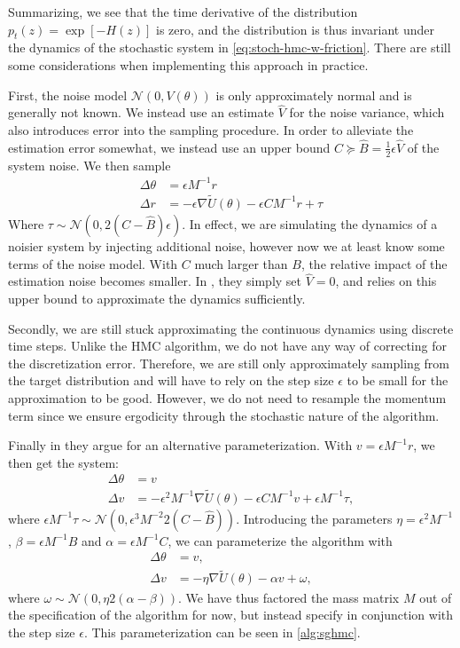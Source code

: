 Summarizing, we see that the time derivative of the distribution $p_t(z)=\exp[-H(z)]$ is zero, and the distribution is thus invariant under the dynamics of the stochastic system in \cref{eq:stoch-hmc-w-friction}. 
There are still some considerations when implementing this approach in practice. 

First, the noise model $\mathcal{N}(0, V(\theta))$ is only approximately normal and is generally not known.
We instead use an estimate $\hat{V}$ for the noise variance, which also introduces error into the sampling procedure. 
In order to alleviate the estimation error somewhat, we instead use an upper bound $C \succeq \hat{B}= \frac{1}{2}\epsilon \hat{V}$ of the system noise.
We then sample
\begin{align}
    \Delta \theta &=  \epsilon M^{-1} r\\
    \Delta r &=  -\epsilon\nabla\tilde{U}(\theta) - \epsilon CM^{-1}r  + \tau
\end{align}
Where $\tau\sim  \mathcal{N}(0, 2(C - \hat{B})\epsilon)$.
In effect, we are simulating the dynamics of a noisier system by injecting additional noise, however now we at least know some terms of the noise model.
With $C$ much larger than $B$, the relative impact of the estimation noise becomes smaller. 
In \cite{chen_stochastic_2014}, they simply set $\hat{V} = 0$, and relies on this upper bound to approximate the dynamics sufficiently.  

Secondly, we are still stuck approximating the continuous dynamics using discrete time steps.
Unlike the HMC algorithm, we do not have any way of correcting for the discretization error. 
Therefore, we are still only approximately sampling from the target distribution and will have to rely on the step size $\epsilon$ to be small for the approximation to be good.
However, we do not need to resample the momentum term since we ensure ergodicity through the stochastic nature of the algorithm.

Finally in \cite{chen_stochastic_2014} they argue for an alternative parameterization.
With $v = \epsilon M^{-1} r$, we then get the system:
\begin{align}
    \Delta \theta &=  v \\
    \Delta v &=  -\epsilon^2 M^{-1} \nabla\tilde{U}(\theta) - \epsilon CM^{-1}v  + \epsilon M^{-1}\tau,
\end{align}
where $\epsilon M^{-1}\tau\sim \mathcal{N}(0, \epsilon^3M^{-2}2(C - \hat{B}))$.
Introducing the parameters $\eta = \epsilon^2M^{-1}$, $\beta = \epsilon M^{-1} B$ and $\alpha = \epsilon M^{-1}C$, we can parameterize the algorithm with
\begin{align}
    \Delta \theta &=  v, \\
    \Delta v &=  -\eta \nabla\tilde{U}(\theta) - \alpha v  + \omega,
\end{align}
where $\omega \sim \mathcal{N}(0, \eta 2(\alpha - \beta))$.
We have thus factored the mass matrix $M$ out of the specification of the algorithm for now, but instead specify in conjunction with the step size $\epsilon$. 
This parameterization can be seen in \cref{alg:sghmc}.

